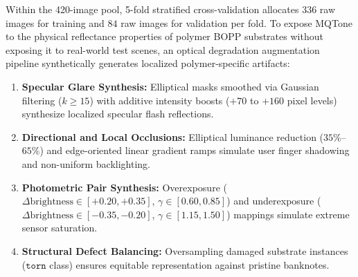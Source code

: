 \documentclass[final,5p,times,twocolumn,authoryear]{elsarticle}
\begin{document}
Within the 420-image pool, 5-fold stratified cross-validation allocates $336$ raw images for training and $84$ raw images for validation per fold. To expose MQTone to the physical reflectance properties of polymer BOPP substrates without exposing it to real-world test scenes, an optical degradation augmentation pipeline synthetically generates localized polymer-specific artifacts:
\begin{enumerate}[label=(\roman*)]
    \item \textbf{Specular Glare Synthesis:} Elliptical masks smoothed via Gaussian filtering ($k \ge 15$) with additive intensity boosts ($+70$ to $+160$ pixel levels) synthesize localized specular flash reflections.
    \item \textbf{Directional and Local Occlusions:} Elliptical luminance reduction ($35\%$--$65\%$) and edge-oriented linear gradient ramps simulate user finger shadowing and non-uniform backlighting.
    \item \textbf{Photometric Pair Synthesis:} Overexposure ($\Delta\text{brightness} \in [+0.20, +0.35]$, $\gamma \in [0.60, 0.85]$) and underexposure ($\Delta\text{brightness} \in [-0.35, -0.20]$, $\gamma \in [1.15, 1.50]$) mappings simulate extreme sensor saturation.
    \item \textbf{Structural Defect Balancing:} Oversampling damaged substrate instances ($\texttt{torn}$ class) ensures equitable representation against pristine banknotes.
\end{enumerate}
\end{document}
